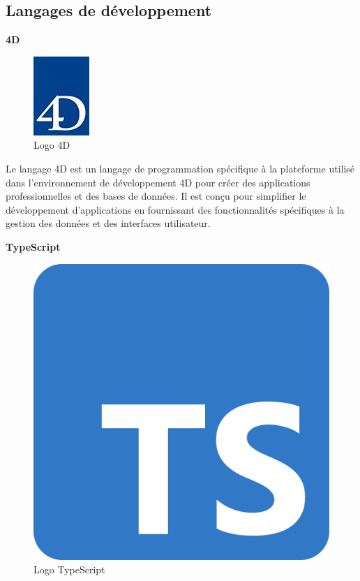 \subsection{Langages de développement}
\large 
\textbf{4D}

\begin{figure}[htbp]
   \centering
   \includegraphics[scale=0.8]{Images/logo-4d.jpg} 
   \caption{Logo 4D}
   \label{fig:4D}
\end{figure}
Le langage 4D est un langage de programmation spécifique à la
 plateforme utilisé dans l’environnement de développement 4D pour
  créer des applications professionnelles et des bases de données. 
  Il est conçu pour simplifier le développement d’applications 
  en fournissant des fonctionnalités spécifiques à la gestion des 
  données et des interfaces utilisateur.

\large 
\textbf{TypeScript}
\begin{figure}[h]
   \centering
   \includegraphics[scale=0.05]{Images/ts.png} 
   \caption{Logo TypeScript}
   \label{fig:ts}
\end{figure}

